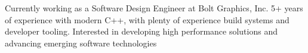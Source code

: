 

\begin{cvparagraph}

Currently working as a Software Design Engineer at Bolt Graphics, Inc.
5+ years of experience with modern C++, with plenty of experience build systems and developer tooling.
Interested in developing high performance solutions and advancing emerging software technologies
\end{cvparagraph}
